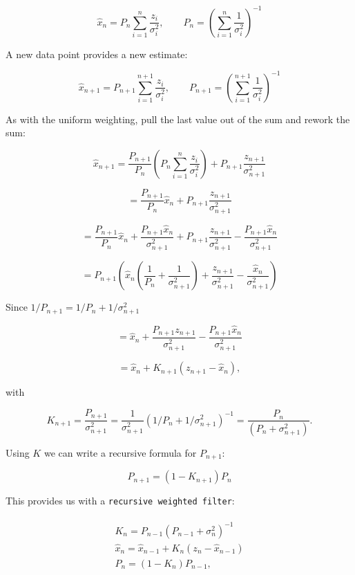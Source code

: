 \[\hat{x}_n = \displaystyle P_n \displaystyle \sum_{i=1}^n \frac{z_i}{\sigma_i^2}, \quad \quad P_n =
\displaystyle \left( \sum_{i=1}^n \frac{1}{\sigma_i^2} \right)^{-1}\]

A new data point provides a new estimate:

\[\hat{x}_{n+1} = \displaystyle P_{n+1} \displaystyle \sum_{i=1}^{n+1} \frac{z_i}{\sigma_i^2},
\quad \quad P_{n+1} =
\displaystyle \left(\sum_{i=1}^{n+1} \frac{1}{\sigma_i^2}\right)^{-1}\]

As with the uniform weighting, pull the last value out of the sum and
rework the sum:

\[\hat{x}_{n+1} = \displaystyle \frac{P_{n+1}}{P_n}\left({P_n}\sum_{i=1}^{n}
\frac{z_i}{\sigma_i^2}\right) + {P_{n+1}}\frac{z_{n+1}}{\sigma_{n+1}^2}\]

\[= \displaystyle \frac{P_{n+1}}{P_n}\hat{x}_n +P_{n+1}\frac{z_{n+1}}{\sigma_{n+1}^2}\]

\[= \displaystyle \frac{P_{n+1}}{P_n}\hat{x}_n + \frac{P_{n+1}\hat{x}_n}{\sigma_{n+1}^2}  + P_{n+1}\frac{z_{n+1}}{\sigma_{n+1}^2}
- \frac{P_{n+1}\hat{x}_n}{\sigma_{n+1}^2}\]

\[= \displaystyle P_{n+1} \left( \hat{x}_n\left(\frac{1}{P_n} + \frac{1}{\sigma_{n+1}^2} \right) + \frac{z_{n+1}}{\sigma_{n+1}^2}
- \frac{\hat{x}_n}{\sigma_{n+1}^2}
\right)\]

Since \(1/P_{n+1} = 1/P_n + 1/\sigma_{n+1}^2\)

\[=
 \hat{x}_n + \frac{P_{n+1}z_{n+1}}{\sigma_{n+1}^2}  - \frac{P_{n+1}\hat{x}_n}{\sigma_{n+1}^2}\]

\[= \hat{x}_n +  K_{n+1}\left(  z_{n+1}- \hat{x}_n \right),\]

with

\[K_{n+1} = \displaystyle \frac{P_{n+1}}{\sigma_{n+1}^2}  = \frac{1}{\sigma_{n+1}^2}\left(1/P_n + 1/\sigma_{n+1}^2\right)^{-1}
 = \displaystyle \frac{P_{n}}{\left(P_{n} + \sigma_{n+1}^2\right)} .\]

Using \(K\) we can write a recursive formula for \(P_{n+1}\):

\[P_{n+1} = \displaystyle  (1 -   K_{n+1}) P_{n}\]

This provides us with a \texttt{recursive\ weighted\ filter}:

\[\begin{aligned}
\begin{array}{l}
K_{n} = \displaystyle P_{n-1} \left(P_{n-1} + \sigma_n^2\right)^{-1} \\[8pt]
\hat{x}_{n} =  \hat{x}_{n-1} +  K_{n}\left(  z_{n}- \hat{x}_{n-1} \right) \\[8pt]
P_n = \displaystyle  (1 -   K_n) P_{n-1} ,
\end{array}
\end{aligned}\]

